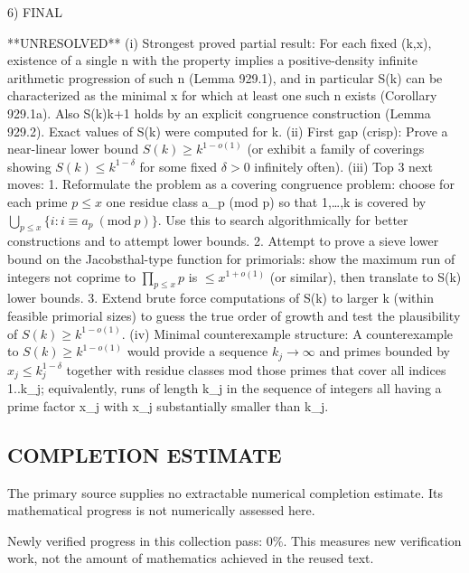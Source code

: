 6) FINAL

**UNRESOLVED**
(i) Strongest proved partial result: For each fixed (k,x), existence of a single n with the property implies a positive-density infinite arithmetic progression of such n (Lemma 929.1), and in particular S(k) can be characterized as the minimal x for which at least one such n exists (Corollary 929.1a). Also S(k)\le k+1 holds by an explicit congruence construction (Lemma 929.2). Exact values of S(k) were computed for k.
(ii) First gap (crisp): Prove a near-linear lower bound \(S(k)\ge k^{1-o(1)}\) (or exhibit a family of coverings showing \(S(k)\le k^{1-\delta}\) for some fixed \(\delta>0\) infinitely often).
(iii) Top 3 next moves:
  1. Reformulate the problem as a covering congruence problem: choose for each prime \(p\le x\) one residue class a_p (mod p) so that {1,\dots,k} is covered by \(\bigcup_{p\le x}\{i: i\equiv a_p\ (\mathrm{mod}\ p)\}\). Use this to search algorithmically for better constructions and to attempt lower bounds.
  2. Attempt to prove a sieve lower bound on the Jacobsthal-type function for primorials: show the maximum run of integers not coprime to \(\prod_{p\le x} p\) is \(\le x^{1+o(1)}\) (or similar), then translate to S(k) lower bounds.
  3. Extend brute force computations of S(k) to larger k (within feasible primorial sizes) to guess the true order of growth and test the plausibility of \(S(k)\ge k^{1-o(1)}\).
(iv) Minimal counterexample structure: A counterexample to \(S(k)\ge k^{1-o(1)}\) would provide a sequence \(k_j\to\infty\) and primes bounded by \(x_j\le k_j^{1-\delta}\) together with residue classes mod those primes that cover all indices 1..k_j; equivalently, runs of length k_j in the sequence of integers all having a prime factor \le x_j with x_j substantially smaller than k_j.


\subsection*{COMPLETION ESTIMATE}
The primary source supplies no extractable numerical completion estimate. Its mathematical progress is not numerically assessed here.

Newly verified progress in this collection pass: $0\%$. This measures new verification work, not the amount of mathematics achieved in the reused text.
